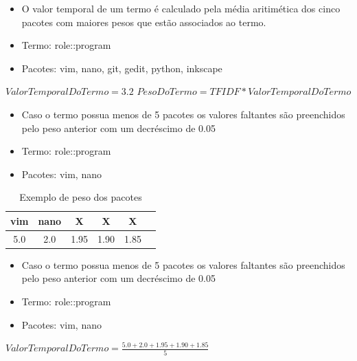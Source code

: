 \begin{frame}
    \begin{itemize}
        \item O valor temporal de um termo é calculado pela média aritimética dos cinco
pacotes com maiores pesos que estão associados
ao termo.
        \item Termo: role::program
        \item Pacotes: vim, nano, git, gedit, python, inkscape
    \end{itemize}

    $ValorTemporalDoTermo = 3.2$
    $PesoDoTermo = TFIDF * ValorTemporalDoTermo$
\end{frame}

\begin{frame}
    \begin{itemize}
        \item Caso o termo possua menos de 5 pacotes os valores faltantes são
    preenchidos pelo peso anterior com um decréscimo de 0.05
        \item Termo: role::program
        \item Pacotes: vim, nano
    \end{itemize}

    \begin{table}[h]
    \centering
    \begin{tabular}{cccccc}
    \hline
    \rowcolor[HTML]{EFEFEF}
    {vim} & {nano} & {X} & {X} & {X} \\ \hline
    {5.0} & {2.0} & {1.95} & {1.90} & {1.85} \\ \hline
    \end{tabular}
    \caption{Exemplo de peso dos pacotes}
    \label{tab:classificacao_pacotes}
    \end{table}
\end{frame}

\begin{frame}
    \begin{itemize}
        \item Caso o termo possua menos de 5 pacotes os valores faltantes são
    preenchidos pelo peso anterior com um decréscimo de 0.05
        \item Termo: role::program
        \item Pacotes: vim, nano
    \end{itemize}

    $ValorTemporalDoTermo = \frac{5.0 + 2.0 + 1.95 + 1.90 + 1.85}{5}$
\end{frame}

